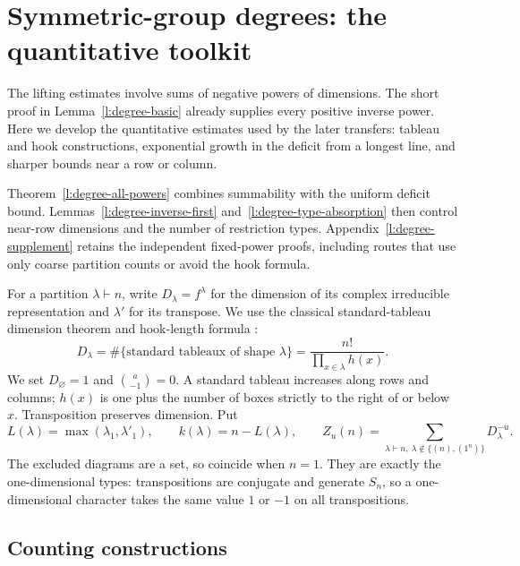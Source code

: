 \section{Symmetric-group degrees: the quantitative toolkit}
\label{l:degrees}\label{l:degrees-section}

The lifting estimates involve sums of negative powers of dimensions.
The short proof in Lemma~\ref{l:degree-basic} already supplies every
positive inverse power. Here we develop the quantitative estimates used
by the later transfers: tableau and hook constructions, exponential
growth in the deficit from a longest line, and sharper bounds near a
row or column.

Theorem~\ref{l:degree-all-powers} combines summability with the uniform
deficit bound. Lemmas~\ref{l:degree-inverse-first}
and~\ref{l:degree-type-absorption} then control near-row dimensions and
the number of restriction types. Appendix~\ref{l:degree-supplement}
retains the independent fixed-power proofs, including routes that use
only coarse partition counts or avoid the hook formula.

For a partition $\lambda\vdash n$, write $D_\lambda=f^\lambda$ for
the dimension of its complex irreducible representation and
$\lambda'$ for its transpose.  We use the classical standard-tableau
dimension theorem and hook-length formula \cite{sagan,etingof}:
\[
 D_\lambda=\#\{\text{standard tableaux of shape }\lambda\}
 =\frac{n!}{\prod_{x\in\lambda}h(x)}.
\]
We set $D_{\varnothing}=1$ and $\binom a{-1}=0$.
A standard tableau increases along rows and columns; $h(x)$ is one
plus the number of boxes strictly to the right of or below $x$.
Transposition preserves dimension.  Put
\[
 L(\lambda)=\max(\lambda_1,\lambda'_1),\qquad
 k(\lambda)=n-L(\lambda),\qquad
 Z_u(n)=\sum_{\lambda\vdash n,\ \lambda\notin\{(n),(1^n)\}}
                     D_\lambda^{-u}.
\]
The excluded diagrams are a set, so coincide when $n=1$.  They are
exactly the one-dimensional types: transpositions are conjugate and
generate $S_n$, so a one-dimensional character takes the same value
$1$ or $-1$ on all transpositions.

\subsection{Counting constructions}

